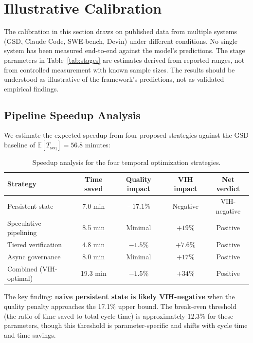 \documentclass[11pt,a4paper]{article}
\theoremstyle{definition}
\theoremstyle{remark}
\newcommand{\E}{\mathbb{E}}
\begin{document}
\section{Illustrative Calibration}\label{sec:calibration}

The calibration in this section draws on published data from multiple systems (GSD, Claude Code, SWE-bench, Devin) under different conditions. No single system has been measured end-to-end against the model's predictions. The stage parameters in Table~\ref{tab:stages} are estimates derived from reported ranges, not from controlled measurement with known sample sizes. The results should be understood as illustrative of the framework's predictions, not as validated empirical findings.

\subsection{Pipeline Speedup Analysis}

We estimate the expected speedup from four proposed strategies against the GSD baseline of $\E[T_{\mathrm{seq}}] = 56.8$ minutes:

\begin{table}[ht]
\centering
\caption{Speedup analysis for the four temporal optimization strategies.}\label{tab:speedup}
\begin{tabular}{lcccc}
\toprule
Strategy & Time saved & Quality impact & VIH impact & Net verdict \\
\midrule
Persistent state & 7.0 min & $-17.1\%$ & Negative & VIH-negative \\
Speculative pipelining & 8.5 min & Minimal & $+19\%$ & Positive \\
Tiered verification & 4.8 min & $-1.5\%$ & $+7.6\%$ & Positive \\
Async governance & 8.0 min & Minimal & $+17\%$ & Positive \\
\midrule
Combined (VIH-optimal) & 19.3 min & $-1.5\%$ & $+34\%$ & Positive \\
\bottomrule
\end{tabular}
\end{table}

The key finding: \textbf{naive persistent state is likely VIH-negative} when the quality penalty approaches the 17.1\% upper bound. The break-even threshold (the ratio of time saved to total cycle time) is approximately 12.3\% for these parameters, though this threshold is parameter-specific and shifts with cycle time and time savings.
\end{document}
